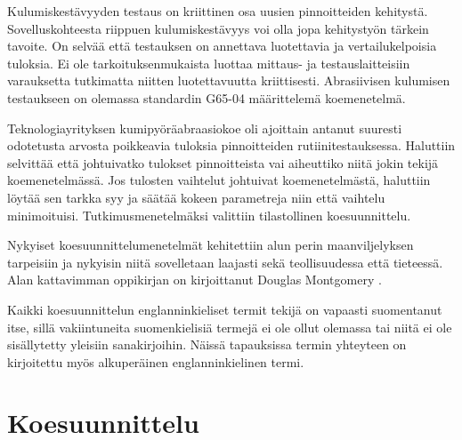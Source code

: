 \documentclass[12pt,a4paper,finnish]{tutthesis}
\begin{document}
Kulumiskestävyyden testaus on kriittinen osa uusien pinnoitteiden kehitystä.
Sovelluskohteesta riippuen kulumiskestävyys voi olla jopa kehitystyön tärkein
tavoite. On selvää että testauksen on annettava luotettavia ja
vertailukelpoisia tuloksia. Ei ole tarkoituksenmukaista luottaa mittaus- ja
testauslaitteisiin varauksetta tutkimatta niitten luotettavuutta kriittisesti.
Abrasiivisen kulumisen testaukseen on olemassa standardin G65-04 \parencite{Standard2010}
määrittelemä koemenetelmä.

Teknologiayrityksen kumipyöräabraasiokoe oli ajoittain antanut suuresti
odotetusta arvosta poikkeavia tuloksia pinnoitteiden rutiinitestauksessa.
Haluttiin selvittää että johtuivatko tulokset pinnoitteista vai aiheuttiko
niitä jokin tekijä koemenetelmässä. Jos tulosten vaihtelut johtuivat
koemenetelmästä, haluttiin löytää sen tarkka syy ja säätää
kokeen parametreja niin että vaihtelu minimoituisi.
Tutkimusmenetelmäksi valittiin tilastollinen koesuunnittelu.

Nykyiset koesuunnittelumenetelmät kehitettiin alun perin
maanviljelyksen tarpeisiin ja nykyisin niitä sovelletaan laajasti
sekä teollisuudessa että tieteessä. Alan kattavimman oppikirjan
on kirjoittanut Douglas Montgomery \parencite*{Montgomery2012}.

Kaikki koesuunnittelun englanninkieliset termit tekijä on vapaasti
suomentanut itse, sillä vakiintuneita suomenkielisiä termejä ei
ole ollut olemassa tai niitä ei ole sisällytetty yleisiin
sanakirjoihin. Näissä tapauksissa termin yhteyteen on kirjoitettu
myös alkuperäinen englanninkielinen termi.




\chapter{Koesuunnittelu}
\label{ch:doe}
\end{document}
